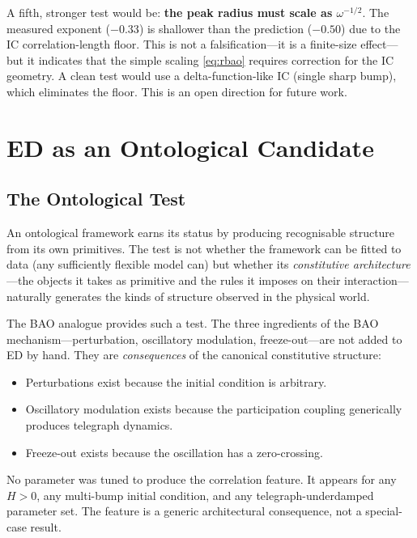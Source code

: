 \documentclass[11pt]{article}
\begin{document}
A fifth, stronger test would be: \textbf{the peak radius must scale as \(\omega^{-1/2}\)}. The measured exponent (\(-0.33\)) is shallower than the prediction (\(-0.50\)) due to the IC correlation-length floor. This is not a falsification---it is a finite-size effect---but it indicates that the simple scaling \eqref{eq:rbao} requires correction for the IC geometry. A clean test would use a delta-function-like IC (single sharp bump), which eliminates the floor. This is an open direction for future work.

\section{ED as an Ontological Candidate}

\subsection{The Ontological Test}

An ontological framework earns its status by producing recognisable structure from its own primitives. The test is not whether the framework can be fitted to data (any sufficiently flexible model can) but whether its \emph{constitutive architecture}---the objects it takes as primitive and the rules it imposes on their interaction---naturally generates the kinds of structure observed in the physical world.

The BAO analogue provides such a test. The three ingredients of the BAO mechanism---perturbation, oscillatory modulation, freeze-out---are not added to ED by hand. They are \emph{consequences} of the canonical constitutive structure:

\begin{itemize}
  \item Perturbations exist because the initial condition is arbitrary.
  \item Oscillatory modulation exists because the participation coupling generically produces telegraph dynamics.
  \item Freeze-out exists because the oscillation has a zero-crossing.
\end{itemize}

No parameter was tuned to produce the correlation feature. It appears for any \(H > 0\), any multi-bump initial condition, and any telegraph-underdamped parameter set. The feature is a generic architectural consequence, not a special-case result.
\end{document}
